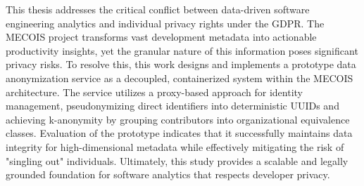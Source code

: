 This thesis addresses the critical conflict between data-driven software engineering analytics and individual privacy rights under the \ac{GDPR}. The MECOIS project transforms vast development metadata into actionable productivity insights, yet the granular nature of this information poses significant privacy risks. To resolve this, this work designs and implements a prototype data anonymization service as a decoupled, containerized system within the MECOIS architecture. The service utilizes a proxy-based approach for identity management, pseudonymizing direct identifiers into deterministic \acp{UUID} and achieving k-anonymity by grouping contributors into organizational equivalence classes. Evaluation of the prototype indicates that it successfully maintains data integrity for high-dimensional metadata while effectively mitigating the risk of "singling out" individuals. Ultimately, this study provides a scalable and legally grounded foundation for software analytics that respects developer privacy.
